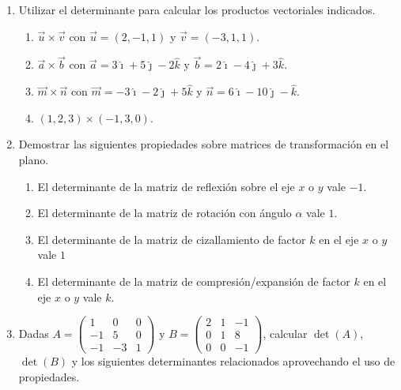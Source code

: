 \documentclass[a4paper]{article}
\newcommand{\exercise}{\item}
\begin{document}
\begin{enumerate}
\begin{multicols}{3}
\begin{enumerate} [label=(\alph*)]
		\item $\left\{\begin{matrix} \alpha x-y+2z=0 \\ -3x+4y+\alpha z=0 \\ 2x+y-3z=0 \end{matrix}\right.$
	\end{enumerate}
	\end{multicols}
	\exercise Utilizar el determinante para calcular los productos vectoriales indicados.
	\begin{enumerate} [label=(\alph*)]
		\item $\vec{u} \times \vec{v}$ con $\vec{u}=(2,-1,1)$ y $\vec{v}=(-3,1,1)$.
		\item $\vec{a} \times \vec{b}$ con $\vec{a}=3\hat{\imath}+5\hat{\jmath}-2\hat{k}$ y $\vec{b}=2\hat{\imath}-4\hat{\jmath}+3\hat{k}$.
		\item $\vec{m} \times \vec{n}$ con $\vec{m}=-3\hat{\imath}-2\hat{\jmath}+5\hat{k}$ y $\vec{n}=6\hat{\imath}-10\hat{\jmath}-\hat{k}$.
		\item $(1,2,3) \times (-1,3,0)$.
	\end{enumerate}
	\exercise Demostrar las siguientes propiedades sobre matrices de transformación en el plano.
	\begin{enumerate} [label=(\alph*)]
		\item El determinante de la matriz de reflexión sobre el eje $x$ o $y$ vale $-1$.
		\item El determinante de la matriz de rotación con ángulo $\alpha$ vale $1$.
		\item El determinante de la matriz de cizallamiento de factor $k$ en el eje $x$ o $y$ vale $1$
		\item El determinante de la matriz de compresión/expansión de factor $k$ en el eje $x$ o $y$ vale $k$.
	\end{enumerate}
	\exercise Dadas $A=\begin{pmatrix} 1 & 0 & 0 \\ -1 & 5 & 0 \\ -1 & -3 & 1 \end{pmatrix}$ y $B=\begin{pmatrix} 2 & 1 & -1 \\ 0 & 1 & 8 \\ 0 & 0 & -1 \end{pmatrix}$, calcular $\det(A)$, $\det(B)$ y los siguientes determinantes relacionados aprovechando el uso de propiedades.
	\begin{enumerate} [label=(\alph*)]

\end{enumerate}
\end{enumerate}
\end{document}
